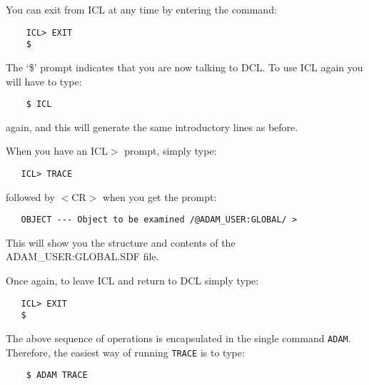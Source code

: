 You can exit from ICL at any time by entering the command:

\begin{small}
\begin{verbatim}
    ICL> EXIT
    $
\end{verbatim}
\end{small}

The `\$' prompt indicates that you are now talking to DCL.
To use ICL again you will have to type:

\begin{small}
\begin{verbatim}
    $ ICL
\end{verbatim}
\end{small}

again, and this will generate the same introductory lines as before.

When you have an ICL$>$ prompt, simply type:

\begin{small}
\begin{verbatim}
   ICL> TRACE
\end{verbatim}
\end{small}

followed by $<$CR$>$ when you get the prompt:

\begin{small}
\begin{verbatim}
   OBJECT --- Object to be examined /@ADAM_USER:GLOBAL/ >
\end{verbatim}
\end{small}

This will show you the structure and contents of the ADAM\_USER:GLOBAL.SDF
file.

Once again, to leave ICL and return to DCL simply type:

\begin{small}
\begin{verbatim}
   ICL> EXIT
   $
\end{verbatim}
\end{small}


The above sequence of operations is encapsulated in the single command
\verb+ADAM+.
Therefore, the easiest way of running \verb+TRACE+ is to type:

\begin{small}
\begin{verbatim}
    $ ADAM TRACE
\end{verbatim}
\end{small}

